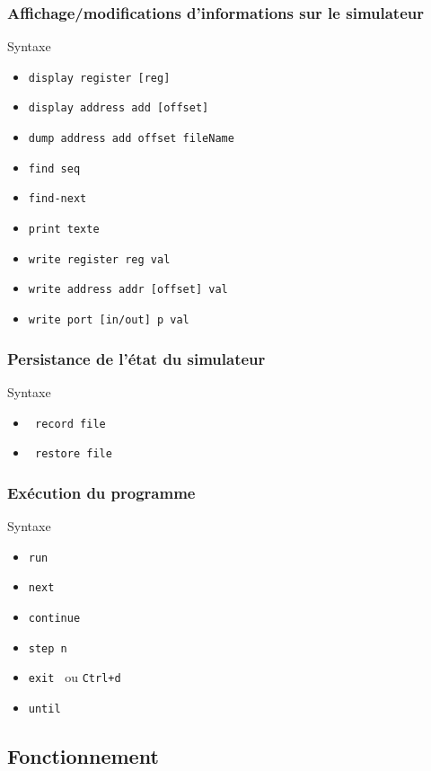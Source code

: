 \documentclass{beamer}
\begin{document}
\begin{frame}[fragile]
	\frametitle{Affichage/modifications d'informations sur le simulateur}
	\begin{block}{Syntaxe}
		\begin{itemize}
		\item \verb|display register [reg]|
		\item \verb|display address add [offset] |
		\item \verb|dump address add offset fileName|
		\item \verb|find seq|
		\item \verb|find-next|
		\item \verb|print texte|
		\item \verb|write register reg val|
		\item \verb|write address addr [offset] val|
		\item \verb|write port [in/out] p val|
		\end{itemize}
	\end{block}
\end{frame}
	
\begin{frame}[fragile]
	\frametitle{Persistance de l'état du simulateur}
	\begin{block}{Syntaxe}
		\begin{itemize}
		\item \verb| record file|
		\item \verb| restore file |
		\end{itemize}
	\end{block}
\end{frame}

\begin{frame}[fragile]
	\frametitle{Exécution du programme}
	\begin{block}{Syntaxe}
		\begin{itemize}
		\item \verb|run |
		\item \verb|next |
		\item \verb|continue |
		\item \verb|step n|
		\item \verb|exit | ou \verb|Ctrl+d|
		\item \verb|until |
		\end{itemize}
	\end{block}
\end{frame}

\subsection{Fonctionnement}
\end{document}
